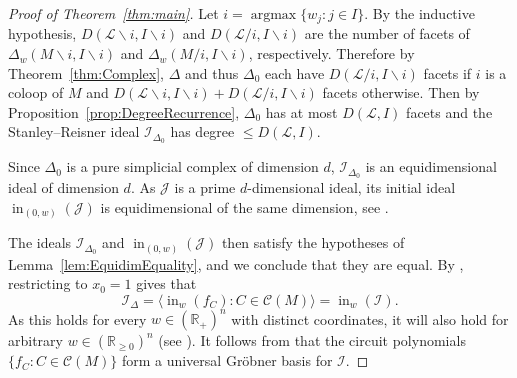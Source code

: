 \documentclass[ALCO,ThmDefs,Unicode,epreuves]{cedram}
\newcommand{\R}{\mathbb{R}}
\newcommand{\I}{\mathcal{I}}
\newcommand{\J}{\mathcal{J}}
\newcommand{\cL}{\mathcal{L}}
\newcommand{\CC}{\mathcal{C}}
\DeclareMathOperator{\In}{in}
\DeclareMathOperator{\argmax}{argmax}
\newcommand{\reldp}{\mathrel{:}}
\begin{document}
\begin{proof}[Proof of Theorem~\ref{thm:main}]
Let $i = \argmax \{w_j : j\in I\}$. By the inductive hypothesis, $D(\cL\backslash i, I\backslash i)$ and $D(\cL/ i, I\backslash i)$
are the number of facets of $\Delta_w(M\backslash i, I\backslash i)$ and $\Delta_w(M/i, I\backslash i)$, respectively. 
Therefore by Theorem~\ref{thm:Complex}, $\Delta$ and thus $\Delta_0$ each have 
$D(\cL/ i, I\backslash i)$ facets if $i$ is a coloop of $M$ and $D(\cL\backslash i, I\backslash i) + D(\cL/ i, I\backslash i)$ facets otherwise. 
Then by Proposition~\ref{prop:DegreeRecurrence}, $\Delta_0$ has at most $D(\cL, I)$ facets and the Stanley--Reisner ideal 
$\I_{\Delta_0}$ has degree $\leq D(\cL, I)$. 


Since $\Delta_0$ is a pure simplicial complex of dimension $d$, $\I_{\Delta_0}$ is an 
equidimensional ideal of dimension $d$. 
As $\J$ is a prime $d$-dimensional ideal, its initial ideal $\In_{(0,w)}(\J)$ is equidimensional of the same 
dimension, see \cite[Lemma~2.4.12]{tropBook}. 

The ideals $\I_{\Delta_0}$ and $\In_{(0,w)}(\J)$ then satisfy the hypotheses of Lemma~\ref{lem:EquidimEquality}, 
and we conclude that they are equal. By \cite[Prop.~2.6.1]{tropBook}, restricting to $x_0=1$ 
gives that 
\[
\I_{\Delta}  =  \langle \In_w(f_C) \reldp  C\in \CC (M) \rangle =  \In_w(\I). 
\]
As this holds for every $w\in (\R_+)^n$ with distinct coordinates, it will also hold for arbitrary $w \in (\R_{\geq 0})^n$ (see \cite[Prop.~1.13]{GrobnerPolytope}).
It follows from \cite[Cor.~1.9, 1.10]{GrobnerPolytope} that the circuit polynomials $\{f_C : C\in \CC (M)\}$ form a universal Gr\"obner basis for $\I$. 
\end{proof}
 
 
\end{document}
